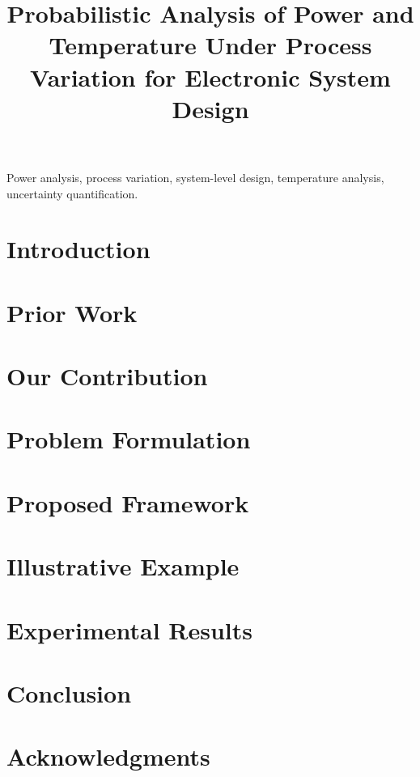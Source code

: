 \documentclass[journal]{IEEEtran}
\title{{\TitleFont Probabilistic Analysis of Power and Temperature Under Process Variation for Electronic System Design}}
\author{}
\begin{document}
  \maketitle

  \begin{abstract}
    
  \end{abstract}

  \begin{IEEEkeywords}
    Power analysis,
    process variation,
    system-level design,
    temperature analysis,
    uncertainty quantification.
  \end{IEEEkeywords}


  \section{Introduction} 
  

  \section{Prior Work} 
  

  \section{Our Contribution} 
  

  \section{Problem Formulation} 
  

  \section{Proposed Framework} 
  

  \section{Illustrative Example} 
  

  \section{Experimental Results} 
  

  \section{Conclusion} 
  

  \section*{Acknowledgments}
  

  
  

  \appendix
  
\end{document}
